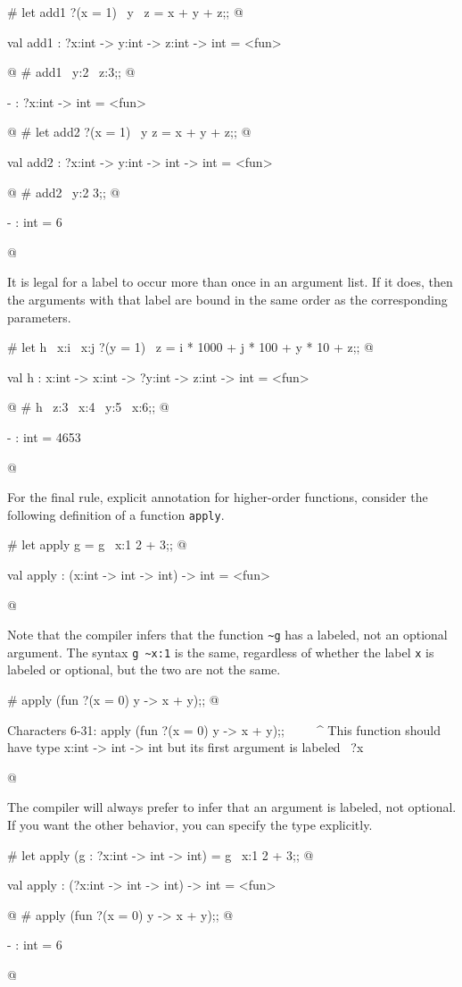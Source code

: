 \begin{ocaml}
# let add1 ?(x = 1) ~y ~z = x + y + z;;
@
\begin{topoutput}
val add1 : ?x:int -> y:int -> z:int -> int = <fun>
\end{topoutput}
@
# add1 ~y:2 ~z:3;;
@
\begin{topoutput}
- : ?x:int -> int = <fun>
\end{topoutput}
@
# let add2 ?(x = 1) ~y z = x + y + z;;
@
\begin{topoutput}
val add2 : ?x:int -> y:int -> int -> int = <fun>
\end{topoutput}
@
# add2 ~y:2 3;;
@
\begin{topoutput}
- : int = 6
\end{topoutput}
@
\end{ocaml}
%
It is legal for a label to occur more than once in an argument list.
If it does, then the arguments with that label are bound in the same
order as the corresponding parameters.

\begin{ocaml}
# let h ~x:i ~x:j ?(y = 1) ~z =
     i * 1000 + j * 100 + y * 10 + z;;
@
\begin{topoutput}
val h : x:int -> x:int -> ?y:int -> z:int -> int = <fun>
\end{topoutput}
@
# h ~z:3 ~x:4 ~y:5 ~x:6;;
@
\begin{topoutput}
- : int = 4653
\end{topoutput}
@
\end{ocaml}
%
For the final rule, explicit annotation for higher-order functions,
consider the following definition of a function \hbox{\lstinline/apply/}.

\begin{ocaml}
# let apply g = g ~x:1 2 + 3;;
@
\begin{topoutput}
val apply : (x:int -> int -> int) -> int = <fun>
\end{topoutput}
@
\end{ocaml}
%
Note that the compiler infers that the function \hbox{\lstinline/~g/} has a
labeled, not an optional argument.  The syntax \hbox{\lstinline/g ~x:1/} is
the same, regardless of whether the label \hbox{\lstinline/x/} is labeled or
optional, but the two are not the same.

\begin{ocaml}
# apply (fun ?(x = 0) y -> x + y);;
@
\begin{topoutput}
Characters 6-31:
  apply (fun ?(x = 0) y -> x + y);;
        ^^^^^^^^^^^^^^^^^^^^^^^^^
This function should have type x:int -> int -> int
but its first argument is labeled ~?x
\end{topoutput}
@
\end{ocaml}
%
The compiler will always prefer to infer that an argument is labeled,
not optional.  If you want the other behavior, you can specify the
type explicitly.

\begin{ocaml}
# let apply (g : ?x:int -> int -> int) = g ~x:1 2 + 3;;
@
\begin{topoutput}
val apply : (?x:int -> int -> int) -> int = <fun>
\end{topoutput}
@
# apply (fun ?(x = 0) y -> x + y);;
@
\begin{topoutput}
- : int = 6
\end{topoutput}
@
\end{ocaml}
